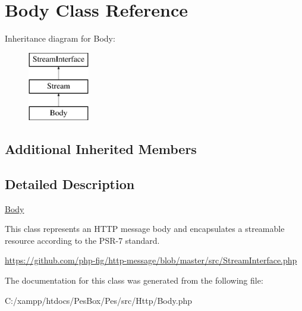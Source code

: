 \hypertarget{class_pes_1_1_http_1_1_body}{}\section{Body Class Reference}
\label{class_pes_1_1_http_1_1_body}
Inheritance diagram for Body\+:\begin{figure}[H]
\begin{center}
\leavevmode
\includegraphics[height=3.000000cm]{class_pes_1_1_http_1_1_body}
\end{center}
\end{figure}
\subsection*{Additional Inherited Members}


\subsection{Detailed Description}
\mbox{\hyperlink{class_pes_1_1_http_1_1_body}{Body}}

This class represents an H\+T\+TP message body and encapsulates a streamable resource according to the P\+S\+R-\/7 standard.

\mbox{\hyperlink{}{https\+://github.\+com/php-\/fig/http-\/message/blob/master/src/\+Stream\+Interface.\+php}}

The documentation for this class was generated from the following file\+:\begin{DoxyCompactItemize}
\item 
C\+:/xampp/htdocs/\+Pes\+Box/\+Pes/src/\+Http/Body.\+php\end{DoxyCompactItemize}
